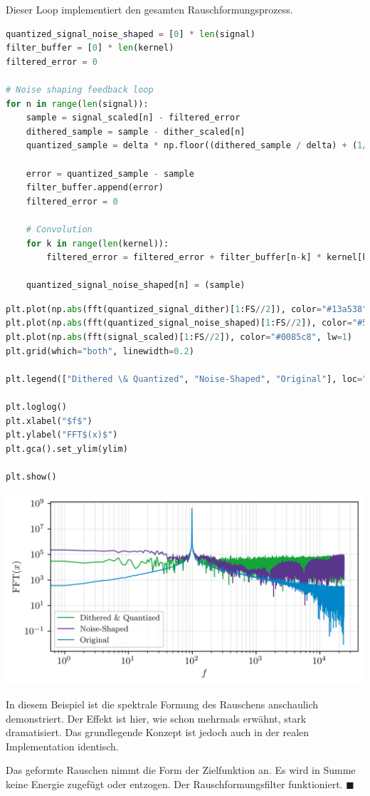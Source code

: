 Dieser Loop implementiert den gesamten Rauschformungsprozess.

\begin{lstlisting}[language=Python]
quantized_signal_noise_shaped = [0] * len(signal)
filter_buffer = [0] * len(kernel)
filtered_error = 0

# Noise shaping feedback loop
for n in range(len(signal)):
    sample = signal_scaled[n] - filtered_error
    dithered_sample = sample - dither_scaled[n]
    quantized_sample = delta * np.floor((dithered_sample / delta) + (1/2))

    error = quantized_sample - sample
    filter_buffer.append(error)
    filtered_error = 0

    # Convolution
    for k in range(len(kernel)):
        filtered_error = filtered_error + filter_buffer[n-k] * kernel[k]

    quantized_signal_noise_shaped[n] = (sample)
\end{lstlisting}

\begin{lstlisting}[language=Python]
plt.plot(np.abs(fft(quantized_signal_dither)[1:FS//2]), color="#13a538", lw=1)
plt.plot(np.abs(fft(quantized_signal_noise_shaped)[1:FS//2]), color="#59358c", lw=1)
plt.plot(np.abs(fft(signal_scaled)[1:FS//2]), color="#0085c8", lw=1)
plt.grid(which="both", linewidth=0.2)

plt.legend(["Dithered \& Quantized", "Noise-Shaped", "Original"], loc="lower left", fontsize="small")

plt.loglog()
plt.xlabel("$f$")
plt.ylabel("FFT$(x)$")
plt.gca().set_ylim(ylim)

plt.show()
\end{lstlisting}

\includegraphics{./img/9dd2df13a0e0795ec7f78029c2fd327701bd8ea4.png}

In diesem Beispiel ist die spektrale Formung des Rauschens anschaulich
demonstriert. Der Effekt ist hier, wie schon mehrmals erwähnt, stark
dramatisiert. Das grundlegende Konzept ist jedoch auch in der realen
Implementation identisch.

Das geformte Rauschen nimmt die Form der Zielfunktion an. Es wird in
Summe keine Energie zugefügt oder entzogen. Der Rauschformungsfilter
funktioniert. \hfill\(\blacksquare\)
